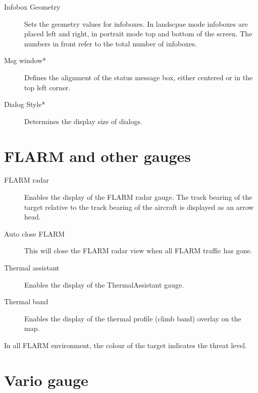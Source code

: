 \begin{description}
\item[Infobox Geometry]  Sets the geometry values for infoboxes. In landscpae
mode infoboxes are placed left and right, in portrait mode top and bottom of the screen. The numbers in front refer 
to the total number of infoboxes.
\item[Msg window*]  Defines the alignment of the status message box, either
centered or in the top left corner.
\item[Dialog Style*]  Determines the display size of dialogs.
\end{description}


\clearpage
\section{FLARM and other gauges}\label{sec:other-gauge}


\label{conf:variogauge}
\begin{description}
\item[FLARM radar]  \label{conf:flarmdisplay} Enables the display of the FLARM
radar gauge. The track bearing of the target relative to the track bearing of the aircraft
is displayed as an arrow head.
\item[Auto close FLARM]  This will close the FLARM radar view when all
FLARM traffic has gone.
\item[Thermal assistant] \label{conf:thermalassistant} Enables the display of the
ThermalAssistant gauge.
\item[Thermal band] \label{conf:thermalband} Enables the display of the
thermal profile (climb band) overlay on the map.
\end{description}

In all FLARM environment, the colour of the target indicates the threat level.


\clearpage
\section{Vario gauge}\label{sec:vario-gauge}

